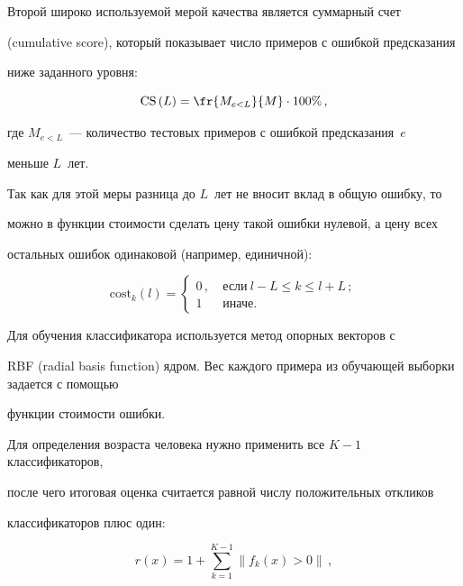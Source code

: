 Второй широко используемой мерой качества является суммарный счет

(cumulative score), который показывает число примеров с ошибкой предсказания

ниже заданного уровня:

$$

\mathrm{CS}\left(L\right) = \fr{ M_{e<L}}{M} \cdot 100\%\,,

$$

где $M_{e<L}$~--- количество тестовых примеров с ошибкой предсказания~$e$

меньше $L$~лет.



Так как для этой меры разница до $L$~лет не вносит вклад в общую ошибку, то

можно в функции стоимости сделать цену такой ошибки нулевой, а цену всех

остальных ошибок одинаковой (например, единичной):

\begin{equation}

\mathrm{cost}_k(l)=\begin{cases}

0\,, &\ \mbox{если}\ l-L\leq k \leq l+L\,;\\

1 & \ \mbox{иначе}.

\end{cases}

\label{e3-r}

\end{equation}



Для обучения классификатора используется метод опорных векторов с

RBF (radial basis function) яд\-ром. Вес каждого примера из обучающей выборки задается с помощью

функции стоимости ошибки.



Для определения возраста человека нужно применить все $K-1$ классификаторов,

после чего итоговая оценка считается равной числу положительных откликов

классификаторов плюс один:

\pagebreak



\noindent

\begin{equation}

r(x)=1+\sum\limits_{k=1}^{K-1} \parallel f_k(x)>0\parallel\,,

\label{e4-r}

\end{equation}

